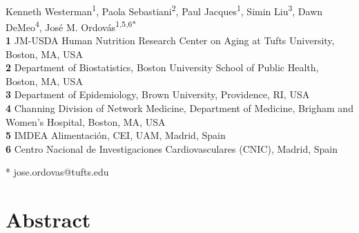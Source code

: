 \documentclass[]{article}
\title{}
\author{}
\date{}
\theoremstyle{definition}
\theoremstyle{definition}
\theoremstyle{definition}
\theoremstyle{remark}
\begin{document}
\begin{flushleft}
{\Large
\textbf{}
}
\newline
\\
Kenneth Westerman\textsuperscript{1},
Paola Sebastiani\textsuperscript{2},
Paul Jacques\textsuperscript{1},
Simin Liu\textsuperscript{3},
Dawn DeMeo\textsuperscript{4},
Jos\'e M. Ordov\'as\textsuperscript{1,5,6*}
\\
\bigskip
\textbf{1} JM-USDA Human Nutrition Research Center on Aging at Tufts University, Boston, MA, USA
\\
\textbf{2} Department of Biostatistics, Boston University School of Public Health, Boston, MA, USA
\\
\textbf{3} Department of Epidemiology, Brown University, Providence, RI, USA
\\
\textbf{4} Channing Division of Network Medicine, Department of Medicine, Brigham and Women's Hospital, Boston, MA, USA
\\
\textbf{5} IMDEA Alimentaci\'on, CEI, UAM, Madrid, Spain
\\
\textbf{6} Centro Nacional de Investigaciones Cardiovasculares (CNIC), Madrid, Spain
\\
\bigskip

* jose.ordovas@tufts.edu

\end{flushleft}

\section{Abstract}\label{abstract}
\end{document}
